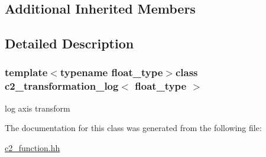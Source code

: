 \subsection*{Additional Inherited Members}


\subsection{Detailed Description}
\subsubsection*{template$<$typename float\-\_\-type$>$class c2\-\_\-transformation\-\_\-log$<$ float\-\_\-type $>$}

log axis transform 

The documentation for this class was generated from the following file\-:\begin{DoxyCompactItemize}
\item 
\hyperlink{c2__function_8hh}{c2\-\_\-function.\-hh}\end{DoxyCompactItemize}
